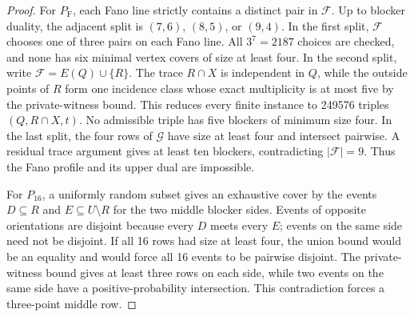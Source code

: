 \documentclass[11pt]{article}
\theoremstyle{definition}
\theoremstyle{remark}
\begin{document}
\begin{proof}
For $P_{\mathrm F}$, each Fano line strictly contains a distinct pair in
$\mathcal F$.  Up to blocker duality, the adjacent split is $(7,6)$,
$(8,5)$, or $(9,4)$.  In the first split, $\mathcal F$ chooses one of three
pairs on each Fano line.  All $3^7=2187$ choices are checked, and none has six
minimal vertex covers of size at least four.  In the second split, write
$\mathcal F=E(Q)\cup\{R\}$.  The trace $R\cap X$ is independent in $Q$, while
the outside points of $R$ form one incidence class whose exact multiplicity
is at most five by the private-witness bound.  This reduces every finite
instance to 249576 triples $(Q,R\cap X,t)$.  No admissible triple has five
blockers of minimum size four.  In the last split, the four rows of
$\mathcal G$ have size at least four and intersect pairwise.  A residual trace
argument gives at least ten blockers, contradicting $|\mathcal F|=9$.
Thus the Fano profile and its upper dual are impossible.

For $P_{16}$, a uniformly random subset gives an exhaustive cover by the
events $D\subseteq R$ and $E\subseteq U\setminus R$ for the two middle
blocker sides.  Events of opposite orientations are disjoint because every
$D$ meets every $E$; events on the same side need not be disjoint.  If all 16
rows had size at least four, the union bound would be an equality and would
force all 16 events to be pairwise disjoint.  The private-witness bound gives
at least three rows on each side, while two events on the same side have a
positive-probability intersection.  This contradiction forces a three-point
middle row.


\end{proof}
\end{document}
